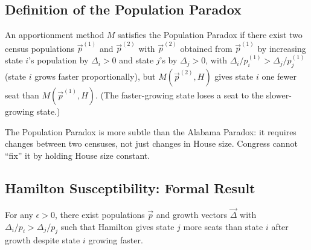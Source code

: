 \label{sec:population}

\subsection{Definition of the Population Paradox}

\begin{definition}
  An apportionment method $M$ satisfies the Population Paradox if there
  exist two census populations $\vec{p}^{(1)}$ and $\vec{p}^{(2)}$
  with $\vec{p}^{(2)}$ obtained from $\vec{p}^{(1)}$ by increasing
  state $i$'s population by $\Delta_i > 0$ and state $j$'s by $\Delta_j > 0$,
  with $\Delta_i/p_i^{(1)} > \Delta_j/p_j^{(1)}$ (state $i$ grows
  faster proportionally), but $M(\vec{p}^{(2)}, H)$ gives state $i$
  one fewer seat than $M(\vec{p}^{(1)}, H)$.
  (The faster-growing state loses a seat to the slower-growing state.)
\end{definition}

The Population Paradox is more subtle than the Alabama Paradox:
it requires changes between two censuses, not just changes in House size.
Congress cannot ``fix'' it by holding House size constant.

\subsection{Hamilton Susceptibility: Formal Result}

\begin{proposition}
  For any $\epsilon > 0$, there exist populations $\vec{p}$ and
  growth vectors $\vec{\Delta}$ with $\Delta_i/p_i > \Delta_j/p_j$
  such that Hamilton gives state $j$ more seats than state $i$
  after growth despite state $i$ growing faster.
\end{proposition}

